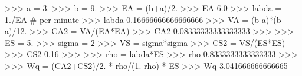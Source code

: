 
>>> a = 3.
>>> b = 9.
>>> EA = (b+a)/2.
>>> EA
6.0
>>> labda = 1./EA # per minute
>>> labda
0.16666666666666666
>>> VA = (b-a)*(b-a)/12.
>>> CA2 = VA/(EA*EA)
>>> CA2
0.08333333333333333
>>>
>>> ES = 5.
>>> sigma = 2
>>> VS = sigma*sigma
>>> CS2 = VS/(ES*ES)
>>> CS2
0.16
>>>
>>> rho = labda*ES
>>> rho
0.8333333333333333
>>>
>>> Wq = (CA2+CS2)/2. * rho/(1.-rho) * ES
>>> Wq
3.041666666666665

